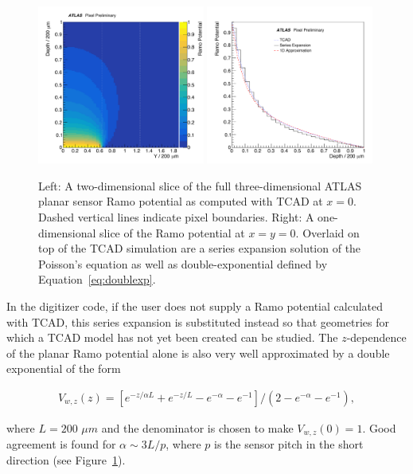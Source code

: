 \begin{figure}[!htpb]
\centering
\includegraphics[width=0.49\textwidth]{newtest_ramoxz_10.pdf}
\includegraphics[width=0.49\textwidth]{newtest_ramoz_10.pdf}
\caption{Left: A two-dimensional slice of the full three-dimensional ATLAS planar sensor Ramo potential as computed with TCAD at $x=0$.  Dashed vertical lines indicate pixel boundaries.  Right: A one-dimensional slice of the Ramo potential at $x=y=0$.  Overlaid on top of the TCAD simulation are a series expansion solution of the Poisson's equation as well as double-exponential defined by Equation~\ref{eq:doublexp}.}
\label{fig:ramo:planar}
\end{figure}

In the digitizer code, if the user does not supply a Ramo potential calculated with TCAD, this series expansion is substituted instead so that geometries for which a TCAD model has not yet been created can be studied.  The $z$-dependence of the planar Ramo potential alone is also very well approximated by a double exponential of the form 

\begin{align}
\label{eq:doublexp}
V_{w,z}(z)=[e^{-z/\alpha L}+e^{-z/L}-e^{-\alpha}-e^{-1}]/(2-e^{-\alpha}-e^{-1}),
\end{align}

where $L=200$ $\mu m$ and the denominator is chosen to make $V_{w,z}(0)=1$.  Good agreement is found for $\alpha\sim 3L/p$, where $p$ is the sensor pitch in the short direction (see Figure~\ref{fig:ramo:planar}). 


